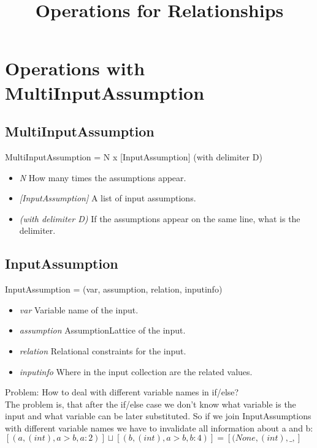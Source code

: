 \documentclass[11pt]{article}
\begin{document}
\title{Operations for Relationships}

\maketitle


\section{Operations with MultiInputAssumption}

\subsection{MultiInputAssumption}

MultiInputAssumption = N x [InputAssumption] (with delimiter D)
\begin{itemize}
  \item \textit{N} How many times the assumptions appear.
  \item \textit{[InputAssumption]} A list of input assumptions.
  \item \textit{(with delimiter D)} If the assumptions appear on the same line, what is the delimiter.
\end{itemize}

\subsection{InputAssumption}

InputAssumption = (var, assumption, relation, inputinfo)
\begin{itemize}
  \item \textit{var} Variable name of the input.
  \item \textit{assumption} AssumptionLattice of the input.
  \item \textit{relation} Relational constraints for the input.
  \item \textit{inputinfo} Where in the input collection are the related values.
\end{itemize}

Problem: How to deal with different variable names in if/else?\\
The problem is, that after the if/else case we don't know what variable is the input and what variable can be later substituted. So if we join InputAssumptions with different variable names we have to invalidate all information about a and b:\\
$[(a, (int), a > b, a:2)] \sqcup [(b, (int), a > b, b:4)] = [(None, (int), \_, {}]$\\
\end{document}
